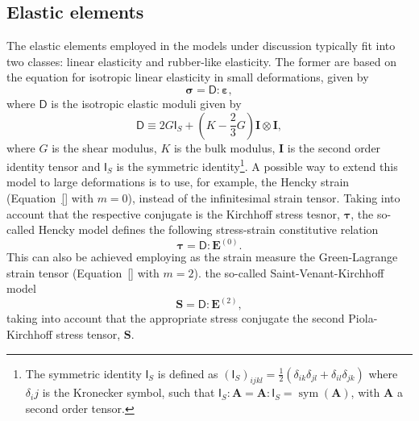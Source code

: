 %

\subsection{Elastic elements}

The elastic elements employed in the models under discussion typically fit into two classes: linear elasticity and rubber-like elasticity.
The former are based on the equation for isotropic linear elasticity in small deformations, given by
\begin{equation}
	\bm \sigma=\bm{\mathsf D}:\bm \varepsilon,
\end{equation}
where $\bm{\mathsf D}$ is the isotropic elastic moduli given by
\begin{equation}
\bm{\mathsf D}\equiv 2 G \bm{\mathsf I}_S+\left(K-\frac{2}{3} G\right) \mathbf I \otimes \mathbf I ,
\end{equation}
where $G$ is the shear modulus, $K$ is the bulk modulus, $\mathbf I$ is the second order identity tensor and $\bm{\mathsf I}_S$ is the symmetric identity\footnote{The symmetric identity $\bm{\mathsf I}_S$ is defined as $(\bm{\mathsf I}_S)_{ijkl} =\frac{1}{2}(\delta_{ik}\delta_{jl} + \delta_{il}\delta_{jk})$ where $\delta_ij$ is the Kronecker symbol, such that $\bm{\mathsf I}_S: \mathbf A = \mathbf A: \bm{\mathsf I}_S = \operatorname{sym} (\mathbf A)$, with $\mathbf A$ a second order tensor.}.
A possible way to extend this model to large deformations is to use, for example, the Hencky strain (Equation~\eqref{} with $m=0$), instead of the infinitesimal strain tensor.
Taking into account that the respective conjugate is the Kirchhoff stress tesnor, $\bm \tau$, the so-called Hencky model defines the following stress-strain constitutive relation
\begin{equation}
	\label{eq:hencky_model}
	\pmb \tau=\bm{\mathsf D}:\mathbf E^{(0)}.
\end{equation}
This can also be achieved employing as the strain measure the Green-Lagrange strain tensor (Equation~\eqref{} with $m=2$). the so-called Saint-Venant-Kirchhoff model
\begin{equation}
	\label{eq:saint_venant_kirchhoff}
	\mathbf S = \bm{\mathsf D}: \mathbf E^{(2)},
\end{equation}
taking into account that the appropriate stress conjugate the second Piola-Kirchhoff stress tensor, $\mathbf S$.

